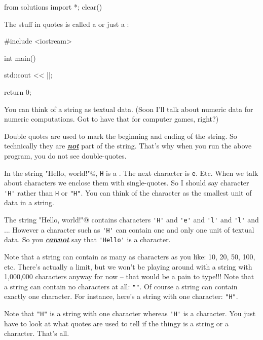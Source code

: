 \begin{python0}
from solutions import *; clear()
\end{python0}

The stuff in quotes is called a  or just a :
\begin{consolethree}[escapeinside=||]
#include <iostream>

int main()
{
    std::cout << ||;

    return 0;
}
\end{consolethree}

You can think of a string as textual data. 
(Soon I'll talk about numeric data for numeric computations. 
Got to have that for computer games, right?)

Double quotes are used to mark the beginning and ending of the string. 
So technically they are \textit{\textbf{\underline{not}}} part of the string. 
That's why when you run the above program, you do not see double-quotes.



In the string 
\verb@"Hello, world!\n"@, 
\verb!H! is a . 
The next character is \verb!e!. Etc. 
When we talk about characters we enclose them with single-quotes. 
So I should say character \verb!'H'! rather than 
\verb!H! or \verb!"H"!. 
You can think of the character as the smallest unit of data in a string. 

The string \verb@"Hello, world!\n"@ contains characters 
\verb!'H'! and \verb!'e'! and \verb!'l'! and \verb!'l'! and 
... 
However a character such as 
\verb!'H'! can contain one and only one unit of textual data. 
So you \textit{\textbf{\underline{cannot}}} say that \verb!'Hello'! is a character. 

Note that a string can contain as many as characters as you like: 
10, 20, 50, 100, etc. 
There's actually a limit, but we won't be playing around with a string with 
1,000,000 characters anyway for now --
that would be a pain to type!!! 
Note that a string can contain no characters at all: 
\verb!""!. 
Of course a string can contain exactly one character. 
For instance, here's a string with one character: \verb!"H"!. 

Note that \verb!"H"! is a string with one character whereas 
\verb!'H'! is a character. 
You just have to look at what quotes are used to tell if the thingy is a 
string or a character. That's all.




